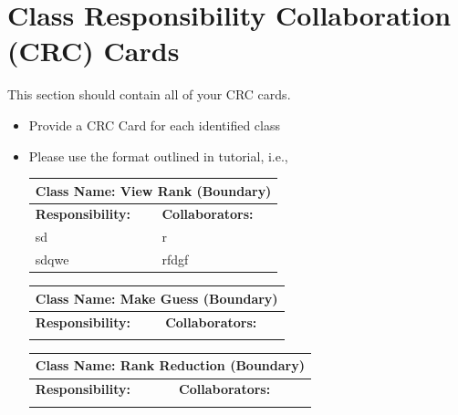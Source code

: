 \documentclass[]{article}
\begin{document}
	
\section{Class Responsibility Collaboration (CRC) Cards}
\label{sec:class_responsibility_collaboration_crc_cards}
This section should contain all of your CRC cards.

\begin{itemize}
	\item Provide a CRC Card for each identified class
	\item Please use the format outlined in tutorial, i.e.,
	\begin{table}[ht]
		\centering
		\begin{tabular}{|p{5cm}|p{5cm}|}
		\hline 
		 \multicolumn{2}{|l|}{\textbf{Class Name:} View Rank (Boundary)} \\
		\hline
		\textbf{Responsibility:} & \textbf{Collaborators:} \\
		\hline
		sd & r \\
		sdqwe & rfdgf \\
		\hline
		\end{tabular}
	\end{table}

	\begin{table}
		\centering
		\begin{tabular}{|p{5cm}|p{5cm}|}
		\hline 
		 \multicolumn{2}{|l|}{\textbf{Class Name:} Make Guess (Boundary)} \\
		\hline
		\textbf{Responsibility:} & \textbf{Collaborators:} \\
		\hline
		\vspace{1in} & \\
		\hline
		\end{tabular}
	\end{table}
	
	\begin{table}
		\centering
		\begin{tabular}{|p{5cm}|p{5cm}|}
		\hline 
		 \multicolumn{2}{|l|}{\textbf{Class Name:} Rank Reduction (Boundary)} \\
		\hline
		\textbf{Responsibility:} & \textbf{Collaborators:} \\
		\hline
		\vspace{1in} & \\
		\hline
		\end{tabular}
	\end{table}


\end{itemize}
\end{document}
